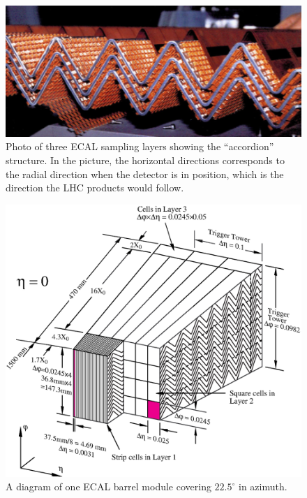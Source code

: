 \begin{figure}[ht]
\centering
\includegraphics[width=.5\textwidth]{figures/atlas/emcal_accordion.png}
\caption{Photo of three ECAL sampling layers
showing the ``accordion'' structure. In the picture, 
the horizontal directions corresponds to 
the radial direction when the detector is in position, which is
the direction the LHC products would follow.}
\label{fig:atlas_emcal_accordion}
\end{figure}

\begin{figure}[ht]
\centering
\includegraphics[width=.8\textwidth]{figures/atlas/emcal_barrel_module.eps}
\caption{ A diagram of one ECAL barrel module 
covering $22.5^{\circ}$ in azimuth.}
\label{fig:atlas_emcal_module}
\end{figure}


